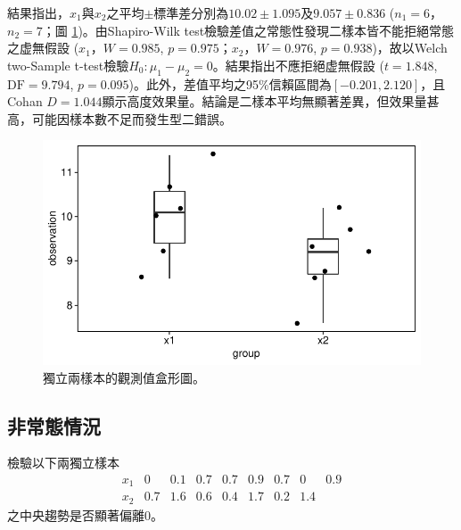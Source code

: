 \documentclass[12pt, a4paper, onecolumn]{article}
\begin{document}
結果指出，$x_1$與$x_2$之平均$\pm$標準差分別為$10.02 \pm 1.095$及$9.057 \pm 0.836$ ($n_1 = 6$，$n_2 = 7$；圖 \ref{fig:normal_independent_test})。由Shapiro-Wilk test檢驗差值之常態性發現二樣本皆不能拒絕常態之虚無假設 ($x_1$，$W = 0.985$, $p = 0.975$；$x_2$，$W = 0.976$, $p = 0.938$)，故以Welch two-Sample t-test檢驗$H_0: \mu_1 - \mu_2 = 0$。結果指出不應拒絕虚無假設 ($t = 1.848$, $\text{DF} = 9.794$, $p = 0.095$)。此外，差值平均之95\%信賴區間為$\left[-0.201, 2.120\right]$，且Cohan $D = 1.044$顯示高度效果量。結論是二樣本平均無顯著差異，但效果量甚高，可能因樣本數不足而發生型二錯誤。

\begin{figure}[ht!]
	\centering
	\includegraphics[]{normal_independent_test.pdf}
	\caption{獨立兩樣本的觀測值盒形圖。}
	\label{fig:normal_independent_test}
\end{figure}

\subsection{非常態情況}
檢驗以下兩獨立樣本
\[
\begin{matrix}
x_1 & 0 & 0.1 & 0.7 & 0.7 & 0.9 & 0.7 & 0 & 0.9 \\
x_2 & 0.7 & 1.6 & 0.6 & 0.4 & 1.7 & 0.2 & 1.4 & 
\end{matrix}
\]
之中央趨勢是否顯著偏離0。
\end{document}
